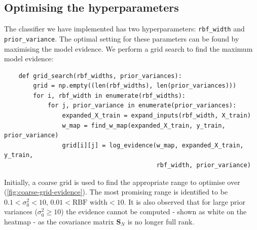 \documentclass[a4paper]{article}
\begin{document}
    \subsection{Optimising the hyperparameters}\label{sec:optimisation}
    The classifier we have implemented has two hyperparameters: \verb`rbf_width` and \verb`prior_variance`. The optimal setting for these parameters can be found by maximising the model evidence. We perform a grid search to find the maximum model evidence:
    \begin{verbatim}
    def grid_search(rbf_widths, prior_variances):
        grid = np.empty((len(rbf_widths), len(prior_variances)))
        for i, rbf_width in enumerate(rbf_widths):
            for j, prior_variance in enumerate(prior_variances):
                expanded_X_train = expand_inputs(rbf_width, X_train)
                w_map = find_w_map(expanded_X_train, y_train, prior_variance)
                grid[i][j] = log_evidence(w_map, expanded_X_train, y_train,
                                          rbf_width, prior_variance)
    \end{verbatim}
    Initially, a coarse grid is used to find the appropriate range to optimise over (\autoref{fig:coarse-grid-evidence}).
    The most promising range is identified to be $0.1 < \sigma_0^2 < 10$, $0.01 < \text{RBF width} < 10$.
    It is also observed that for large prior variances ($\sigma_0^2 \geq 10$) the evidence cannot be computed - shown as white on the heatmap - as the covariance matrix $\bm{S}_N$ is no longer full rank.
\end{document}
